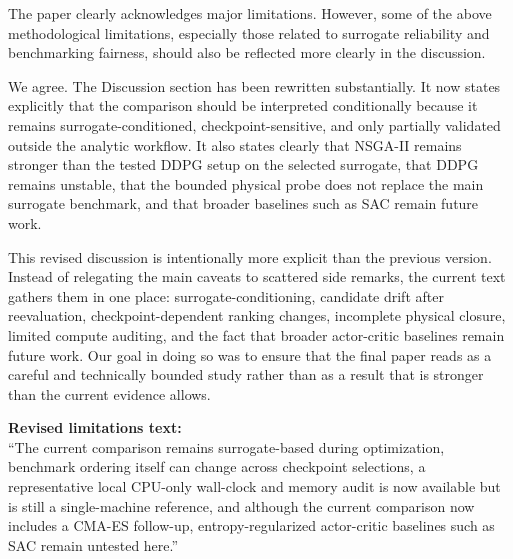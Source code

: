 \begin{ReviewerComment}
The paper clearly acknowledges major limitations. However, some of the above methodological limitations, especially those related to surrogate reliability and benchmarking fairness, should also be reflected more clearly in the discussion.
\end{ReviewerComment}
%
\begin{Answer}
We agree. The Discussion section has been rewritten substantially. It now states explicitly that the comparison should be interpreted conditionally because it remains surrogate-conditioned, checkpoint-sensitive, and only partially validated outside the analytic workflow. It also states clearly that NSGA-II remains stronger than the tested DDPG setup on the selected surrogate, that DDPG remains unstable, that the bounded physical probe does not replace the main surrogate benchmark, and that broader baselines such as SAC remain future work.

This revised discussion is intentionally more explicit than the previous version. Instead of relegating the main caveats to scattered side remarks, the current text gathers them in one place: surrogate-conditioning, candidate drift after reevaluation, checkpoint-dependent ranking changes, incomplete physical closure, limited compute auditing, and the fact that broader actor-critic baselines remain future work. Our goal in doing so was to ensure that the final paper reads as a careful and technically bounded study rather than as a result that is stronger than the current evidence allows.
\end{Answer}
\begin{RevisionExcerpt}
\noindent\textbf{Revised limitations text:}\\
``The current comparison remains surrogate-based during optimization, benchmark ordering itself can change across checkpoint selections, a representative local CPU-only wall-clock and memory audit is now available but is still a single-machine reference, and although the current comparison now includes a CMA-ES follow-up, entropy-regularized actor-critic baselines such as SAC remain untested here.''
\end{RevisionExcerpt}
